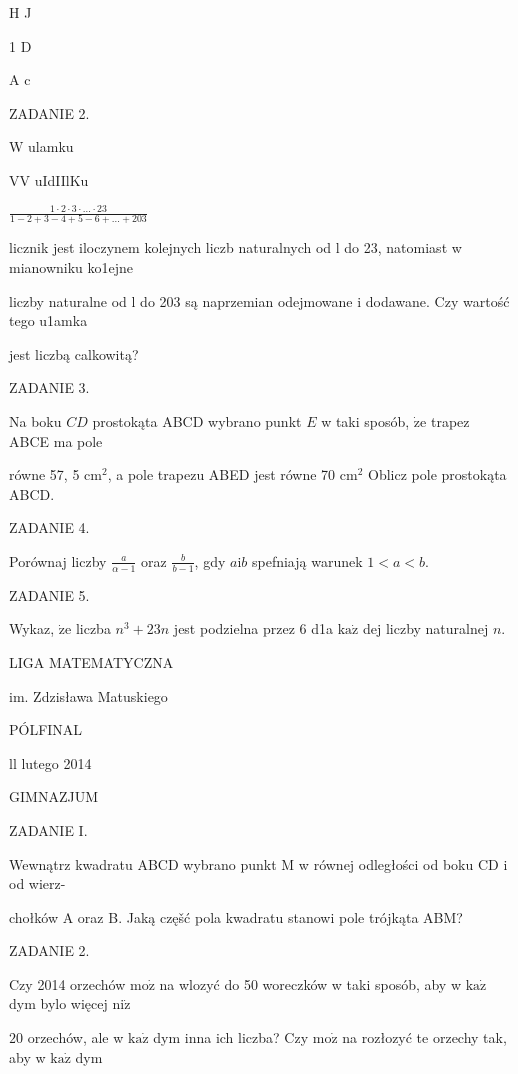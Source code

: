 \documentclass[a4paper,12pt]{article}
\begin{document}
H  J

1  D

A  c

ZADANIE 2.

W ulamku

$\mathrm{V}\mathrm{V}$ uIdIIlKu

$\displaystyle \frac{1\cdot 2\cdot 3\cdot\ldots\cdot 23}{1-2+3-4+5-6+\ldots+203}$

licznik jest iloczynem kolejnych liczb naturalnych od l do 23, natomiast w mianowniku ko1ejne

liczby naturalne od l do 203 są naprzemian odejmowane i dodawane. Czy wartość tego u1amka

jest liczbą calkowitą?

ZADANIE 3.

Na boku $CD$ prostokąta ABCD wybrano punkt $E$ w taki sposób, $\dot{\mathrm{z}}\mathrm{e}$ trapez ABCE ma pole

równe 57, 5 $\mathrm{c}\mathrm{m}^{2}$, a pole trapezu ABED jest równe 70 $\mathrm{c}\mathrm{m}^{2}$ Oblicz pole prostokąta ABCD.

ZADANIE 4.

Porównaj liczby $\displaystyle \frac{a}{\alpha-1}$ oraz $\displaystyle \frac{b}{b-1}$, gdy $a\mathrm{i}b$ spefniają warunek $1<a<b.$

ZADANIE 5.

Wykaz, $\dot{\mathrm{z}}\mathrm{e}$ liczba $n^{3}+23n$ jest podzielna przez 6 d1a $\mathrm{k}\mathrm{a}\dot{\mathrm{z}}$ dej liczby naturalnej $n.$






LIGA MATEMATYCZNA

im. Zdzisława Matuskiego

PÓLFINAL

ll lutego 2014

GIMNAZJUM

ZADANIE I.

Wewnątrz kwadratu ABCD wybrano punkt M w równej odległości od boku CD i od wierz-

chołków A oraz B. Jaką częšć pola kwadratu stanowi pole trójkąta ABM?

ZADANIE 2.

Czy 2014 orzechów $\mathrm{m}\mathrm{o}\dot{\mathrm{z}}$ na wlozyć do 50 woreczków w taki sposób, aby w $\mathrm{k}\mathrm{a}\dot{\mathrm{z}}$ dym bylo więcej $\mathrm{n}\mathrm{i}\dot{\mathrm{z}}$

$20$ orzechów, ale w $\mathrm{k}\mathrm{a}\dot{\mathrm{z}}$ dym inna ich liczba? Czy $\mathrm{m}\mathrm{o}\dot{\mathrm{z}}$ na rozłozyć te orzechy tak, aby w $\mathrm{k}\mathrm{a}\dot{\mathrm{z}}$ dym
\end{document}
